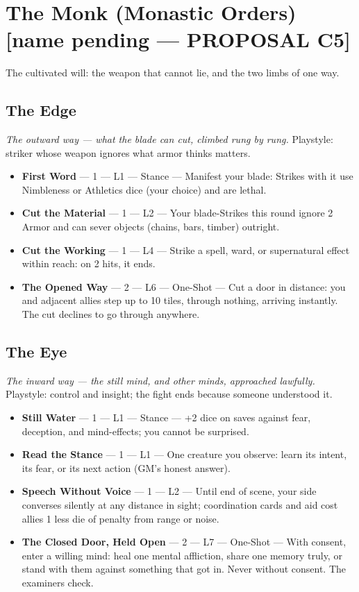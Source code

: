 \section{The Monk \textnormal{(Monastic Orders)} \textnormal{[name pending --- PROPOSAL C5]}}

The cultivated will: the weapon that cannot lie, and the two limbs of one way.

\subsection{The Edge}
\textit{The outward way --- what the blade can cut, climbed rung by rung.} Playstyle: striker whose weapon ignores what armor thinks matters.
\begin{itemize}
    \item \textbf{First Word} --- 1 --- L1 --- Stance --- Manifest your blade: Strikes with it use Nimbleness or Athletics dice (your choice) and are lethal.
    \item \textbf{Cut the Material} --- 1 --- L2 --- Your blade-Strikes this round ignore 2 Armor and can sever objects (chains, bars, timber) outright.
    \item \textbf{Cut the Working} --- 1 --- L4 --- Strike a spell, ward, or supernatural effect within reach: on 2 hits, it ends.
    \item \textbf{The Opened Way} --- 2 --- L6 --- One-Shot --- Cut a door in distance: you and adjacent allies step up to 10 tiles, through nothing, arriving instantly. The cut declines to go through anywhere.
\end{itemize}

\subsection{The Eye}
\textit{The inward way --- the still mind, and other minds, approached lawfully.} Playstyle: control and insight; the fight ends because someone understood it.
\begin{itemize}
    \item \textbf{Still Water} --- 1 --- L1 --- Stance --- +2 dice on saves against fear, deception, and mind-effects; you cannot be surprised.
    \item \textbf{Read the Stance} --- 1 --- L1 --- One creature you observe: learn its intent, its fear, or its next action (GM's honest answer).
    \item \textbf{Speech Without Voice} --- 1 --- L2 --- Until end of scene, your side converses silently at any distance in sight; coordination cards and aid cost allies 1 less die of penalty from range or noise.
    \item \textbf{The Closed Door, Held Open} --- 2 --- L7 --- One-Shot --- With consent, enter a willing mind: heal one mental affliction, share one memory truly, or stand with them against something that got in. Never without consent. The examiners check.
\end{itemize}


